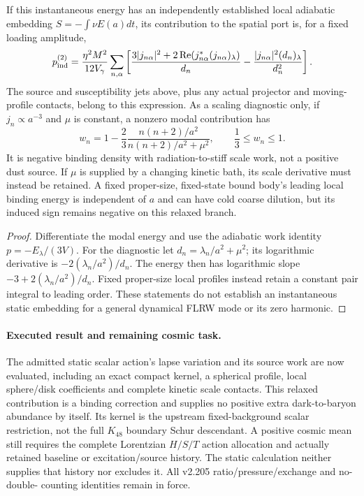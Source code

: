 \documentclass[12pt,a4paper]{article}
\begin{document}
\begin{corollary}
\label{p8:cor:v2206-profile-scale-pressure}
If this instantaneous energy has an independently established local
adiabatic embedding $S=-\int\nu E(a)dt$, its contribution to the spatial
port is, for a fixed loading amplitude,
\begin{equation}
\label{p8:eq:v2206-profile-scale-pressure}
 p_{\rm ind}^{(2)}=\frac{\eta^2M^2}{12V_\gamma}
 \sum_{n,\alpha}\left[
 \frac{3|j_{n\alpha}|^2+2\operatorname{Re}(j_{n\alpha}^*
                                    (j_{n\alpha})_\lambda)}{d_n}
 -\frac{|j_{n\alpha}|^2(d_n)_\lambda}{d_n^2}\right].
\end{equation}
The source and susceptibility jets above, plus any actual projector and
moving-profile contacts, belong to this expression.
As a scaling diagnostic only, if $j_n\propto a^{-3}$ and $\mu$ is
constant, a nonzero modal contribution has
\[
 w_n=1-\frac23\frac{n(n+2)/a^2}{n(n+2)/a^2+\mu^2},
 \qquad \frac13\le w_n\le1.
\]
It is negative binding density with radiation-to-stiff scale work, not
a positive dust source. If $\mu$ is supplied by a changing kinetic bath,
its scale derivative must instead be retained. A fixed proper-size,
fixed-state bound body's leading local binding energy is independent
of $a$ and can have cold coarse dilution, but its induced sign remains
negative on this relaxed branch.
\end{corollary}
\begin{proof}
Differentiate the modal energy and use the adiabatic work identity
$p=-E_\lambda/(3V)$. For the diagnostic let
$d_n=\lambda_n/a^2+\mu^2$; its logarithmic derivative is
$-2(\lambda_n/a^2)/d_n$. The energy then has logarithmic slope
$-3+2(\lambda_n/a^2)/d_n$. Fixed proper-size local profiles instead
retain a constant pair integral to leading order. These statements do
not establish an instantaneous static embedding for a general dynamical
FLRW mode or its zero harmonic.
\end{proof}

\paragraph{Executed result and remaining cosmic task.}
The admitted static scalar action's lapse variation and its source work
are now evaluated, including an exact compact kernel, a spherical profile,
local sphere/disk coefficients and complete kinetic scale contacts.
This relaxed contribution is a binding correction and supplies no positive
extra dark-to-baryon abundance by itself. Its kernel is the upstream
fixed-background scalar restriction, not the full $K_{48}$ boundary
Schur descendant. A positive cosmic mean still requires the complete
Lorentzian $H/S/T$ action allocation and actually retained baseline or
excitation/source history. The static calculation neither supplies that
history nor excludes it. All v2.205 ratio/pressure/exchange and no-double-
counting identities remain in force.
\end{document}
